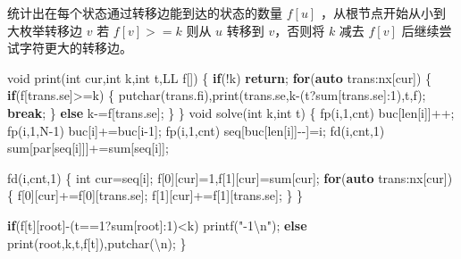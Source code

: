 \documentclass[
]{article}
\newenvironment{Shaded}{}{}
\newcommand{\CharTok}[1]{\textcolor[rgb]{0.25,0.44,0.63}{#1}}
\newcommand{\ControlFlowTok}[1]{\textcolor[rgb]{0.00,0.44,0.13}{\textbf{#1}}}
\newcommand{\DataTypeTok}[1]{\textcolor[rgb]{0.56,0.13,0.00}{#1}}
\newcommand{\DecValTok}[1]{\textcolor[rgb]{0.25,0.63,0.44}{#1}}
\newcommand{\KeywordTok}[1]{\textcolor[rgb]{0.00,0.44,0.13}{\textbf{#1}}}
\newcommand{\NormalTok}[1]{#1}
\newcommand{\SpecialCharTok}[1]{\textcolor[rgb]{0.25,0.44,0.63}{#1}}
\newcommand{\StringTok}[1]{\textcolor[rgb]{0.25,0.44,0.63}{#1}}
\begin{document}
统计出在每个状态通过转移边能到达的状态的数量 \(f[u]\)
，从根节点开始从小到大枚举转移边 \(v\) 若 \(f[v]>=k\) 则从 \(u\) 转移到
\(v\)，否则将 \(k\) 减去 \(f[v]\) 后继续尝试字符更大的转移边。

\begin{Shaded}
\begin{Highlighting}[]
\DataTypeTok{void}\NormalTok{ print(}\DataTypeTok{int}\NormalTok{ cur,}\DataTypeTok{int}\NormalTok{ k,}\DataTypeTok{int}\NormalTok{ t,LL f[])}
\NormalTok{\{}
    \ControlFlowTok{if}\NormalTok{(!k) }\ControlFlowTok{return}\NormalTok{;}
    \ControlFlowTok{for}\NormalTok{(}\KeywordTok{auto}\NormalTok{ trans:nx[cur])}
\NormalTok{    \{}
        \ControlFlowTok{if}\NormalTok{(f[trans.se]\textgreater{}=k)}
\NormalTok{        \{}
\NormalTok{            putchar(trans.fi),print(trans.se,k{-}(t?sum[trans.se]:}\DecValTok{1}\NormalTok{),t,f);}
            \ControlFlowTok{break}\NormalTok{;}
\NormalTok{        \}}
        \ControlFlowTok{else}\NormalTok{ k{-}=f[trans.se];}
\NormalTok{    \}}
\NormalTok{\}}
\DataTypeTok{void}\NormalTok{ solve(}\DataTypeTok{int}\NormalTok{ k,}\DataTypeTok{int}\NormalTok{ t)}
\NormalTok{\{}
\NormalTok{    fp(i,}\DecValTok{1}\NormalTok{,cnt) buc[len[i]]++;}
\NormalTok{    fp(i,}\DecValTok{1}\NormalTok{,N{-}}\DecValTok{1}\NormalTok{) buc[i]+=buc[i{-}}\DecValTok{1}\NormalTok{];}
\NormalTok{    fp(i,}\DecValTok{1}\NormalTok{,cnt) seq[buc[len[i]]{-}{-}]=i;}
\NormalTok{    fd(i,cnt,}\DecValTok{1}\NormalTok{) sum[par[seq[i]]]+=sum[seq[i]];}

\NormalTok{    fd(i,cnt,}\DecValTok{1}\NormalTok{)}
\NormalTok{    \{}
        \DataTypeTok{int}\NormalTok{ cur=seq[i];}
\NormalTok{        f[}\DecValTok{0}\NormalTok{][cur]=}\DecValTok{1}\NormalTok{,f[}\DecValTok{1}\NormalTok{][cur]=sum[cur];}
        \ControlFlowTok{for}\NormalTok{(}\KeywordTok{auto}\NormalTok{ trans:nx[cur])}
\NormalTok{        \{}
\NormalTok{            f[}\DecValTok{0}\NormalTok{][cur]+=f[}\DecValTok{0}\NormalTok{][trans.se];}
\NormalTok{            f[}\DecValTok{1}\NormalTok{][cur]+=f[}\DecValTok{1}\NormalTok{][trans.se];}
\NormalTok{        \}}
\NormalTok{    \}}

    \ControlFlowTok{if}\NormalTok{(f[t][root]{-}(t==}\DecValTok{1}\NormalTok{?sum[root]:}\DecValTok{1}\NormalTok{)\textless{}k) printf(}\StringTok{"{-}1}\SpecialCharTok{\textbackslash{}n}\StringTok{"}\NormalTok{);}
    \ControlFlowTok{else}\NormalTok{ print(root,k,t,f[t]),putchar(}\CharTok{\textquotesingle{}}\SpecialCharTok{\textbackslash{}n}\CharTok{\textquotesingle{}}\NormalTok{);}
\NormalTok{\}}
\end{Highlighting}
\end{Shaded}
\end{document}
